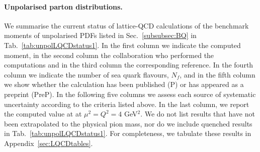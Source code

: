 \paragraph{Unpolarised parton distributions.}{
We summarise the current status of lattice-QCD calculations of the benchmark 
moments of unpolarised PDFs listed in Sec.~\ref{subsubsec:BQ} in 
Tab.~\ref{tab:unpolLQCDstatus1}. 
%
In the first column we indicate the computed moment, in the second column
the collaboration who performed the computations and in the third column
the corresponding reference.
%
In the fourth column we indicate the number of sea quark flavours, $N_f$, 
and in the fifth column we show whether the calculation has been published (P) 
or has appeared as a preprint (PreP).
%
In the following five columns we assess each source of systematic uncertainty
according to the criteria listed above. 
%
In the last column, we report the computed value at at $\mu^2=Q^2=4$ GeV$^2$.
%
We do not list results that have not been extrapolated to the physical pion 
mass, nor do we include quenched results in Tab.~\ref{tab:unpolLQCDstatus1}. 
%
For completeness, we tabulate these results in Appendix~\ref{sec:LQCDtables}.

}
